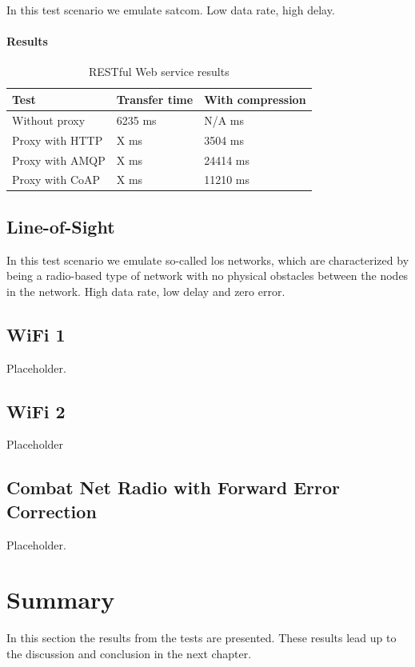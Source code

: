 In this test scenario we emulate \gls{satcom}. Low data rate, high delay.

\paragraph{Results}

\begin{table}[h!]
\begin{tabular}{| l | l | l |}
\hline
  \textbf{Test} & \textbf{Transfer time} & \textbf{With compression}\\ \hline
  Without proxy & 6235 ms & N/A ms \\ \hline
  Proxy with HTTP & X ms & 3504 ms \\ \hline
  Proxy with AMQP & X ms & 24414 ms \\ \hline
  Proxy with CoAP & X ms & 11210 ms \\ \hline
\end{tabular}
\caption{RESTful Web service results}
\end{table}

\subsection{Line-of-Sight}

In this test scenario we emulate so-called \gls{los} networks, which are
characterized by being a radio-based type of network with no physical obstacles
between the nodes in the network. High data rate, low delay and zero error.

\subsection{WiFi 1}

Placeholder.


\subsection{WiFi 2}

Placeholder

\subsection{Combat Net Radio with Forward Error Correction}

Placeholder.

\section{Summary}

In this section the results from the tests are presented. These results lead up
to the discussion and conclusion in the next chapter.
